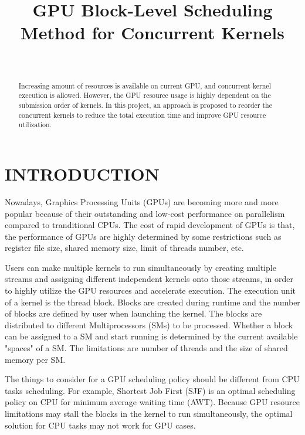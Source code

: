 \documentclass[12pt,journal,compsoc]{IEEEtran}
\begin{document}
\title{\LARGE \bf GPU Block-Level Scheduling Method for Concurrent Kernels}

\author{ \\
}

\maketitle

\begin{abstract}
Increasing amount of resources is available on current GPU, and concurrent kernel execution is allowed. However, the GPU resource usage is highly dependent on the submission order of kernels. In this project, an approach is proposed to reorder the concurrent kernels to reduce the total execution time and improve GPU resource utilization. 
\end{abstract}


\section{INTRODUCTION}
Nowadays, Graphics Processing Units (GPUs) are becoming more and more popular because of their outstanding and low-cost performance on parallelism compared to tranditional CPUs. The cost of rapid development of GPUs is that, the performance of GPUs are highly determined by some restrictions such as register file size, shared memory size, limit of threads number, etc. 

Users can make multiple kernels to run simultaneously by creating multiple streams and assigning different independent kernels onto those streams, in order to highly utilize the GPU resources and accelerate execution. The execution unit of a kernel is the thread block. Blocks are created during runtime and the number of blocks are defined by user when launching the kernel. The blocks are distributed to different Multiprocessors (SMs) to be processed. Whether a block can be assigned to a SM and start running is determined by the current available "spaces" of a SM. The limitations are number of threads and the size of shared memory per SM.

The things to consider for a GPU scheduling policy should be different from CPU tasks scheduling. For example, Shortest Job First (SJF) is an optimal scheduling policy on CPU for minimum average waiting time (AWT). Because GPU resource limitations may stall the blocks in the kernel to run simultaneously, the optimal solution for CPU tasks may not work for GPU cases.
\end{document}
